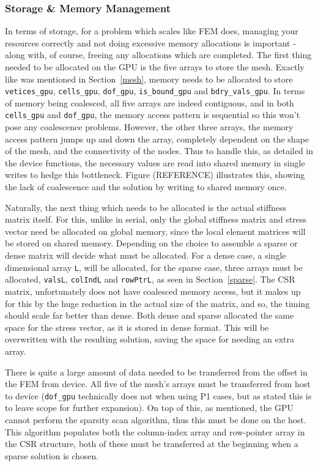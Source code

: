 \subsubsection{Storage \& Memory Management}

In terms of storage, for a problem which scales like FEM does, managing your resources correctly and not doing excessive memory allocations is important - along with, of course, freeing any allocations which are completed. The first thing needed to be allocated on the GPU is the five arrays to store the mesh. Exactly like was mentioned in Section~\ref{mesh}, memory needs to be allocated to store \texttt{vetices\_gpu}, \texttt{cells\_gpu}, \texttt{dof\_gpu}, \texttt{is\_bound\_gpu} and \texttt{bdry\_vals\_gpu}. In terms of memory being coalesced, all five arrays are indeed contiguous, and in both \texttt{cells\_gpu} and \texttt{dof\_gpu}, the memory access pattern is sequential so this won't pose any coalescence problems. However, the other three arrays, the memory access pattern jumps up and down the array, completely dependent on the shape of the mesh, and the connectivity of the nodes. Thus to handle this, as detailed in the device functions, the necessary values are read into shared memory in single writes to hedge this bottleneck. Figure (REFERENCE) illustrates this, showing the lack of coalescence and the solution by writing to shared memory once.

Naturally, the next thing which needs to be allocated is the actual stiffness matrix itself. For this, unlike in serial, only the global stiffness matrix and stress vector need be allocated on global memory, since the local element matrices will be stored on shared memory. Depending on the choice to assemble a sparse or dense matrix will decide what must be allocated. For a dense case, a single dimensional array \texttt{L}, will be allocated, for the sparse case, three arrays must be allocated, \texttt{valsL}, \texttt{colIndL} and \texttt{rowPtrL}, as seen in Section~\ref{sparse}. The CSR matrix, unfortunately does not have coalesced memory access, but it makes up for this by the huge reduction in the actual size of the matrix, and so, the timing should scale far better than dense. Both dense and sparse allocated the same space for the stress vector, as it is stored in dense format. This will be overwritten with the resulting solution, saving the space for needing an extra array.

There is quite a large amount of data needed to be transferred from the offset in the FEM from device. All five of the mesh's arrays must be transferred from host to device (\texttt{dof\_gpu} technically does not when using P1 cases, but as stated this is to leave scope for further expansion). On top of this, as mentioned, the GPU cannot perform the sparsity scan algorithm, thus this must be done on the host. This algorithm populates both the column-index array and row-pointer array in the CSR structure, both of these must be transferred at the beginning when a sparse solution is chosen.

